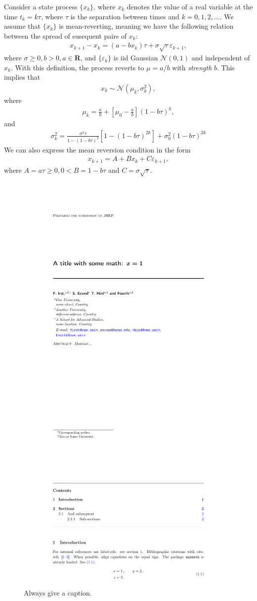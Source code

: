 \documentclass[a4paper,11pt]{article}
\begin{document}
Consider a state process $\{x_k\}$, where $x_k$ denotes the value of a real variable at the time $t_k = k \tau$, where $\tau$ is the separation between times and $k=0, 1, 2, \dots$. We assume that $\{ x_k \}$ is mean-reverting, meaning we have the following relation between the spread of susequent pairs of $x_k$:
%
\begin{align}
	x_{k+1} - x_k = (a-b x_k) \tau + \sigma \sqrt{\tau} \varepsilon_{k+1},
\end{align}
%
where $\sigma \geq 0, b > 0, a \in \mathbf{R}$, and $\{ \varepsilon_k \}$ is iid Gaussian $\mathcal{N}(0, 1)$ and independent of ${x_k}$. With this definition, the process reverts to $\mu = a/b$ with \textit{strength} $b$. This implies that
%
\begin{align}
	x_k \sim \mathcal{N}(\mu_k, \sigma_k^2),
\end{align}
%
where
%
\begin{align}
	\mu_k = \frac{a}{b} +\left[\mu_0 - \frac{a}{b} \right](1 - b \tau)^k,
\end{align}
%
and
%
\begin{align}
	\sigma_k^2 = \frac{\sigma^2 \tau}{1-(1-b \tau)^2} \left [ 1-(1-b\tau)^{2k} \right] + \sigma_0^2 (1-b \tau)^{2k}
\end{align}
%
We can also express the mean reversion condition in the form
%
\begin{align}
	x_{k+1} = A + B x_k + C \varepsilon_{k+1},
\end{align}
%
where $A = a \tau \geq 0, 0 < B = 1- b \tau$ and $C = \sigma \sqrt{\tau}$.
\begin{figure}[tbp]
\centering %
\includegraphics[width=.45\textwidth,trim=0 380 0 200,clip]{img1.pdf}
\hfill
\includegraphics[width=.45\textwidth,origin=c,angle=180]{img2.pdf}
\caption{\label{fig:i} Always give a caption.}
\end{figure}
\end{document}
